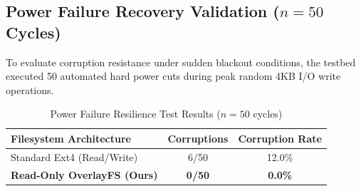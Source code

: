 \documentclass[conference]{IEEEtran}
\begin{document}
\begin{table}[htbp]
\centering
\caption{System Resilience and Lifecycle Overhead Comparison}
\label{tab:ota_comparison}
\begin{center}
\end{center}
\end{table}

\subsection{Power Failure Recovery Validation ($n=50$ Cycles)}
To evaluate corruption resistance under sudden blackout conditions, the testbed executed 50 automated hard power cuts during peak random 4KB I/O write operations.

\begin{table}[htbp]
\caption{Power Failure Resilience Test Results ($n=50$ cycles)}
\begin{center}
\begin{tabular}{lcc}
\toprule
\textbf{Filesystem Architecture} & \textbf{Corruptions} & \textbf{Corruption Rate} \\
\midrule
Standard Ext4 (Read/Write) & 6/50 & 12.0\% \\
\textbf{Read-Only OverlayFS (Ours)} & \textbf{0/50} & \textbf{0.0\%} \\
\bottomrule
\end{tabular}
\end{center}
\label{tab:power_failure}
\end{table}
\end{document}
